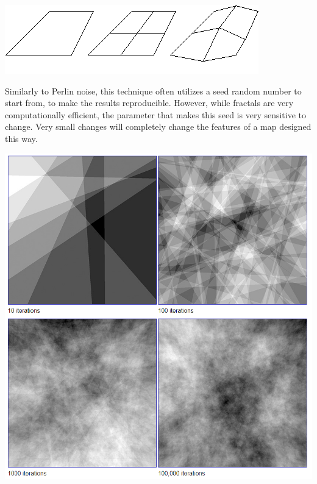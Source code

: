 \documentclass[10pt]{report}
\begin{document}
		\begin{minipage}{\textwidth}
			\centering
			\includegraphics[scale=1]{landscapes}
			\label{fig:spatsub}
		\end{minipage}
		
		Similarly to Perlin noise, this technique often utilizes a seed random number to start from, to make the results reproducible. However, while fractals are very computationally efficient, the parameter that makes this seed is very sensitive to change. Very small changes will completely change the features of a map designed this way.
		
		\begin{minipage}{\textwidth}
			\centering
			\includegraphics[scale=.5]{fractal-noise}
			\label{fig:fractal-land}
		\end{minipage}
		
\end{document}
